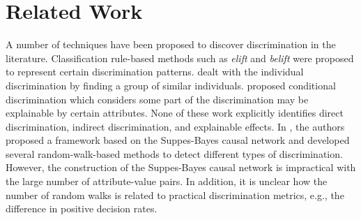 \documentclass[letterpaper]{article}
\begin{document}
\section{Related Work}
A number of techniques have been proposed to discover discrimination in the literature. 
Classification rule-based methods such as \emph{elift} \cite{pedreshi2008discrimination} and \emph{belift} \cite{mancuhan2014combating} were proposed to represent certain discrimination patterns. \cite{luong2011k,zhang2016situation} dealt with the individual discrimination by finding a group of similar individuals. \cite{zliobaite2011handling} proposed conditional discrimination which considers some part of the discrimination may be explainable by certain attributes. None of these work explicitly identifies direct discrimination, indirect discrimination, and explainable effects. In \cite{DBLP:journals/corr/BonchiHMR15}, the authors proposed a framework based on the Suppes-Bayes causal network and developed several random-walk-based methods to detect different types of discrimination. However, the construction of the Suppes-Bayes causal network is impractical with the large number of attribute-value pairs. In addition, it is unclear how the number of random walks is related to practical discrimination metrics, e.g., the difference in positive decision rates.

\end{document}
